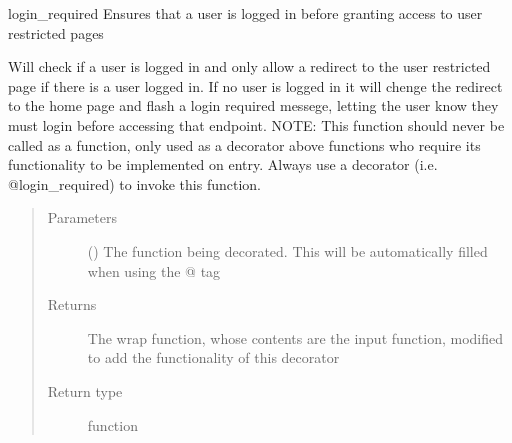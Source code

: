 \documentclass[letterpaper,10pt,english]{sphinxmanual}
\begin{document}
\begin{fulllineitems}
\label{\detokenize{flaskapp.config:flaskapp.config.decorators.login_required}}
login\_required Ensures that a user is logged in before granting access to user restricted pages

Will check if a user is logged in and only allow a redirect to the user restricted page if there is
a user logged in. If no user is logged in it will chenge the redirect to the home page and flash a
login required messege, letting the user know they must login before accessing that endpoint.
NOTE: This function should never be called as a function, only used as a decorator above functions
who require its functionality to be implemented on entry. Always use a decorator (i.e. @login\_required)
to invoke this function.
\begin{quote}\begin{description}
\item[{Parameters}] \leavevmode
{} () \textendash{} The function being decorated. This will be automatically filled when using the @ tag

\item[{Returns}] \leavevmode
The wrap function, whose contents are the input function, modified to add the functionality of this decorator

\item[{Return type}] \leavevmode
function

\end{description}\end{quote}

\end{fulllineitems}

\end{document}
